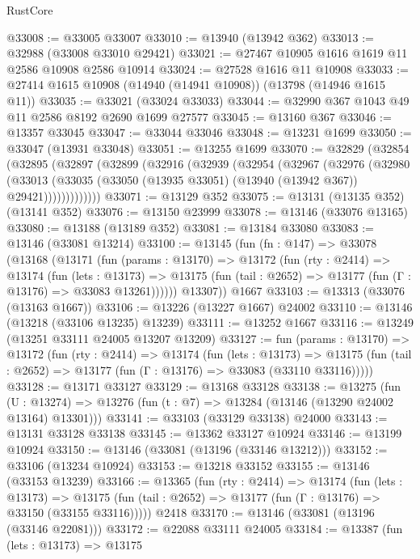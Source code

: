 \begin{lexlean}{RustCore}
\begin{coremodule}
@33008 := @33005 @33007
@33010 := @13940 (@13942 @362)
@33013 := @32988 (@33008 @33010 @29421)
@33021 := @27467 @10905 @1616 @1619 @11 @2586 @10908 @2586 @10914
@33024 := @27528 @1616 @11 @10908
@33033 := @27414 @1615 @10908 (@14940 (@14941 @10908)) (@13798 (@14946 @1615 @11))
@33035 := @33021 (@33024 @33033)
@33044 := @32990 @367 @1043 @49 @11 @2586 @8192 @2690 @1699 @27577
@33045 := @13160 @367
@33046 := @13357 @33045
@33047 := @33044 @33046
@33048 := @13231 @1699
@33050 := @33047 (@13931 @33048)
@33051 := @13255 @1699
@33070 := @32829
    (@32854
      (@32895
        (@32897
          (@32899
            (@32916
              (@32939
                (@32954
                  (@32967
                    (@32976
                      (@32980
                        (@33013
                          (@33035 (@33050 (@13935 @33051) (@13940 (@13942 @367)) @29421)))))))))))))
@33071 := @13129 @352
@33075 := @13131 (@13135 @352) (@13141 @352)
@33076 := @13150 @23999
@33078 := @13146 (@33076 @13165)
@33080 := @13188 (@13189 @352)
@33081 := @13184 @33080
@33083 := @13146 (@33081 @13214)
@33100 := @13145
    (fun (fn : @147) =>
    @33078
      (@13168
        (@13171
          (fun (params : @13170) =>
          @13172
            (fun (rty : @2414) =>
            @13174
              (fun (lets : @13173) =>
              @13175 (fun (tail : @2652) => @13177 (fun (Γ : @13176) => @33083 @13261))))))
        @13307))
    @1667
@33103 := @13313 (@33076 (@13163 @1667))
@33106 := @13226 (@13227 @1667) @24002
@33110 := @13146 (@13218 (@33106 @13235) @13239)
@33111 := @13252 @1667
@33116 := @13249 (@13251 @33111 @24005 @13207 @13209)
@33127 := fun (params : @13170) =>
  @13172
    (fun (rty : @2414) =>
    @13174
      (fun (lets : @13173) =>
      @13175 (fun (tail : @2652) => @13177 (fun (Γ : @13176) => @33083 (@33110 @33116)))))
@33128 := @13171 @33127
@33129 := @13168 @33128
@33138 := @13275
    (fun (U : @13274) => @13276 (fun (t : @7) => @13284 (@13146 (@13290 @24002 @13164) @13301)))
@33141 := @33103 (@33129 @33138) @24000
@33143 := @13131 @33128 @33138
@33145 := @13362 @33127 @10924
@33146 := @13199 @10924
@33150 := @13146 (@33081 (@13196 (@33146 @13212)))
@33152 := @33106 (@13234 @10924)
@33153 := @13218 @33152
@33155 := @13146 (@33153 @13239)
@33166 := @13365
    (fun (rty : @2414) =>
    @13174
      (fun (lets : @13173) =>
      @13175 (fun (tail : @2652) => @13177 (fun (Γ : @13176) => @33150 (@33155 @33116)))))
    @2418
@33170 := @13146 (@33081 (@13196 (@33146 @22081)))
@33172 := @22088 @33111 @24005
@33184 := @13387
    (fun (lets : @13173) =>
    @13175

\end{coremodule}
\end{lexlean}
